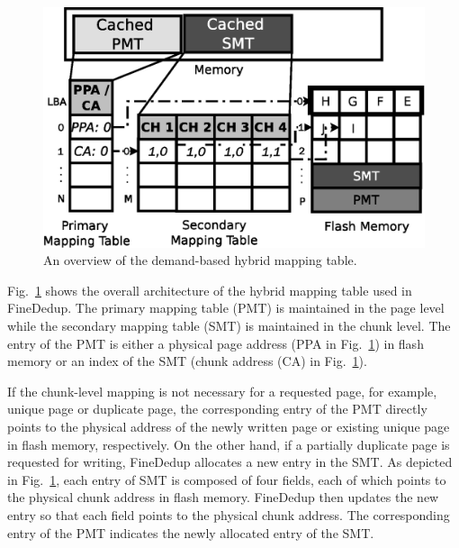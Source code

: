 \begin{figure}[t]
	\center
	\includegraphics[scale=0.5]{figure/finededup/hybridmapping_1}
	\caption{An overview of the demand-based hybrid mapping table.} %
	\label{fig:hybridmapping}
\end{figure}


Fig.~\ref{fig:hybridmapping} shows the overall architecture of the hybrid mapping table used in FineDedup.
The primary mapping table (PMT) is maintained in the page level 
while the secondary mapping table (SMT) is maintained in the chunk level.
The entry of the PMT is either a physical page address (PPA in Fig.~\ref{fig:hybridmapping}) in flash memory or 
an index of the SMT (chunk address (CA) in Fig.~\ref{fig:hybridmapping}). 

If the chunk-level mapping is not necessary for a requested page, for example, unique page or duplicate page,
the corresponding entry of the PMT directly points to the physical address of the 
newly written page or existing unique page in flash memory, respectively.
On the other hand, if a partially duplicate page is requested for writing, 
FineDedup allocates a new entry in the SMT.
As depicted in Fig.~\ref{fig:hybridmapping},
each entry of SMT is composed of four fields, each of which points to the physical chunk address 
in flash memory.
FineDedup then updates the new entry so that each field points to the physical chunk address.
The corresponding entry of the PMT indicates the newly allocated entry of the SMT.

